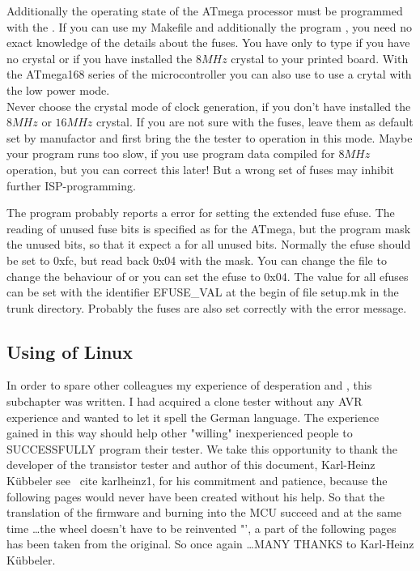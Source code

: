 Additionally the operating state of the ATmega processor must be programmed with the .
If you can use my Makefile and additionally the program  \cite{avrdude}, you need no exact
knowledge of the details about the fuses.
You have only to type  if you have no crystal or
 if you have installed the \(8MHz\) crystal to your printed board.
With the ATmega168 series of the microcontroller you can also use 
to use a crytal with the low power mode.\\
Never choose the crystal mode of clock generation, if you don't have installed
the \(8MHz\) or \(16MHz\) crystal.
If you are not sure with the fuses, leave them as default
set by manufactor and first bring the the tester to operation in this mode.
Maybe your program runs too slow, if you use program data compiled for
\(8MHz\) operation, but you can correct this later!
But a wrong set of fuses may inhibit further ISP-programming.

The program  probably reports a error for setting the extended fuse efuse.
The reading of unused fuse bits is specified as  for the ATmega, but the
 program mask the unused bits, so that it expect a  for all unused bits.
Normally the efuse should be set to 0xfc, but  read back 0x04 with the mask.
You can change the file  to change the behaviour of  or
you can set the efuse to 0x04. 
The value for all efuses can be set with the identifier EFUSE\_VAL at the begin of file setup.mk
in the trunk directory.
Probably the fuses are also set correctly with the error message.

\newpage
\subsection{Using of Linux}
In order to spare other colleagues my experience of desperation and ,
this subchapter was written.
I had acquired a clone tester without any AVR experience and wanted to let it spell the
German language. 
The experience gained in this way should help other "willing" inexperienced people to
SUCCESSFULLY program their tester. 
We take this opportunity to thank the developer of the transistor tester and author of this document, Karl-Heinz Kübbeler see \ cite {karlheinz1}, for his commitment and patience,
because the following pages would never have been created without his help. 
So that the translation of the firmware and burning into the MCU succeed and at the same
time \dots the wheel doesn't have to be reinvented "',
a part of the following pages has been taken from the original. 
So once again \dots \LARGE {MANY THANKS}
\normalsize to Karl-Heinz Kübbeler. 


